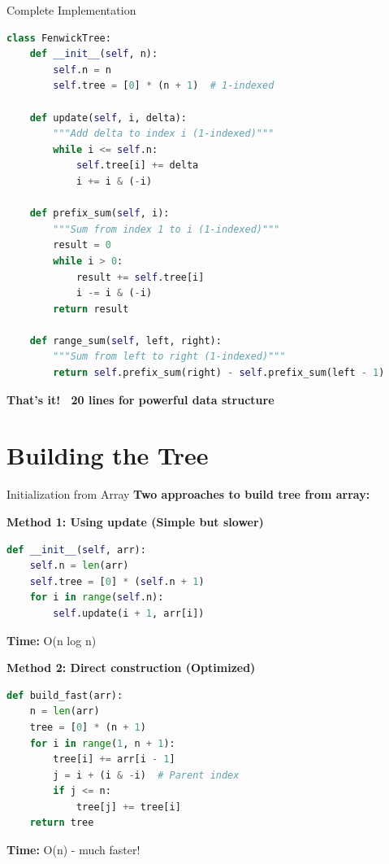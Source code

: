 \documentclass[aspectratio=169]{beamer}
\begin{document}
\begin{frame}[fragile]{Complete Implementation}
  \begin{lstlisting}[language=Python, basicstyle=\ttfamily\footnotesize]
class FenwickTree:
    def __init__(self, n):
        self.n = n
        self.tree = [0] * (n + 1)  # 1-indexed

    def update(self, i, delta):
        """Add delta to index i (1-indexed)"""
        while i <= self.n:
            self.tree[i] += delta
            i += i & (-i)

    def prefix_sum(self, i):
        """Sum from index 1 to i (1-indexed)"""
        result = 0
        while i > 0:
            result += self.tree[i]
            i -= i & (-i)
        return result

    def range_sum(self, left, right):
        """Sum from left to right (1-indexed)"""
        return self.prefix_sum(right) - self.prefix_sum(left - 1)
  \end{lstlisting}

  \textbf{That's it! ~20 lines for powerful data structure}
\end{frame}

\section{Building the Tree}

\begin{frame}[fragile]{Initialization from Array}
  \textbf{Two approaches to build tree from array:}

  \vspace{0.3cm}
  \textbf{Method 1: Using update (Simple but slower)}
  \begin{lstlisting}[language=Python, basicstyle=\ttfamily\footnotesize]
def __init__(self, arr):
    self.n = len(arr)
    self.tree = [0] * (self.n + 1)
    for i in range(self.n):
        self.update(i + 1, arr[i])
  \end{lstlisting}

  \textbf{Time:} O(n log n)

  \vspace{0.5cm}
  \textbf{Method 2: Direct construction (Optimized)}
  \begin{lstlisting}[language=Python, basicstyle=\ttfamily\footnotesize]
def build_fast(arr):
    n = len(arr)
    tree = [0] * (n + 1)
    for i in range(1, n + 1):
        tree[i] += arr[i - 1]
        j = i + (i & -i)  # Parent index
        if j <= n:
            tree[j] += tree[i]
    return tree
  \end{lstlisting}

  \textbf{Time:} O(n) - much faster!
\end{frame}
\end{document}
